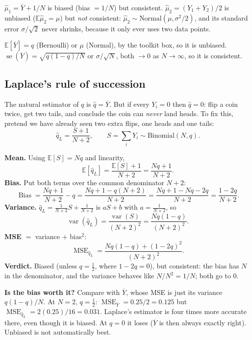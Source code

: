 \documentclass[11pt]{article}
\newcommand{\E}{\mathbb{E}}
\newcommand{\Var}{\operatorname{var}}
\newcommand{\se}{\operatorname{se}}
\newcommand{\MSE}{\operatorname{MSE}}
\newcommand{\Bias}{\operatorname{Bias}}
\newcommand{\Bin}{\text{Binomial}}
\newcommand{\Norm}{\text{Normal}}
\newcommand{\Ybar}{\overline{Y}}
\begin{document}
\begin{tipbox}[title={Unbiased and consistent are different}]
$\hat\mu_1=\Ybar+1/N$ is biased (bias $=1/N$) but consistent. $\hat\mu_2=(Y_1+Y_2)/2$ is unbiased
($\E\hat\mu_2=\mu$) but \emph{not} consistent: $\hat\mu_2\sim\Norm(\mu,\sigma^2/2)$, and its standard error $\sigma/\sqrt2$ never shrinks,
because it only ever uses two data points.
\end{tipbox}

\begin{examplebox}[title={Question (10/5): is the sample mean unbiased? consistent?}]
$\E[\Ybar]=q$ (Bernoulli) or $\mu$ (Normal), by the toolkit box, so it is unbiased.
$\se(\Ybar)=\sqrt{q(1-q)/N}$ or $\sigma/\sqrt N$, both $\to0$ as $N\to\infty$, so it is consistent.
\end{examplebox}

\subsection{Laplace's rule of succession}
The natural estimator of $q$ is $\hat q=\Ybar$. But if every $Y_i=0$ then $\hat q=0$: flip a coin twice, get two tails, and conclude the
coin can \emph{never} land heads. To fix this, pretend we have already seen two extra flips, one heads and one tails:
\[
\hat q_L=\frac{S+1}{N+2},\qquad S=\sum_iY_i\sim\Bin(N,q).
\]
\begin{examplebox}[title={Question (10/5): find the bias, variance and MSE of $\hat q_L$}]
\textbf{Mean.} Using $\E[S]=Nq$ and linearity,
\[
\E[\hat q_L]=\frac{\E[S]+1}{N+2}=\frac{Nq+1}{N+2}.
\]
\textbf{Bias.} Put both terms over the common denominator $N+2$:
\[
\Bias=\frac{Nq+1}{N+2}-q=\frac{Nq+1-q(N+2)}{N+2}=\frac{Nq+1-Nq-2q}{N+2}=\frac{1-2q}{N+2}.
\]
\textbf{Variance.} $\hat q_L=\frac{1}{N+2}S+\frac{1}{N+2}$ is $aS+b$ with $a=\frac1{N+2}$, so
\[
\Var(\hat q_L)=\frac{\Var(S)}{(N+2)^2}=\frac{Nq(1-q)}{(N+2)^2}.
\]
\textbf{MSE} $=$ variance $+$ bias$^2$:
\[
\MSE_{\hat q_L}=\frac{Nq(1-q)+(1-2q)^2}{(N+2)^2}.
\]
\textbf{Verdict.} Biased (unless $q=\tfrac12$, where $1-2q=0$), but consistent: the bias has $N$ in the denominator, and the variance
behaves like $N/N^2=1/N$; both go to $0$.

\textbf{Is the bias worth it?} Compare with $\Ybar$, whose MSE is just its variance $q(1-q)/N$. At $N=2$, $q=\tfrac12$:
$\MSE_{\Ybar}=0.25/2=0.125$ but $\MSE_{\hat q_L}=2(0.25)/16=0.031$. Laplace's estimator is four times more accurate there, even though it
is biased. At $q=0$ it loses ($\Ybar$ is then always exactly right). Unbiased is not automatically best.
\end{examplebox}
\end{document}
